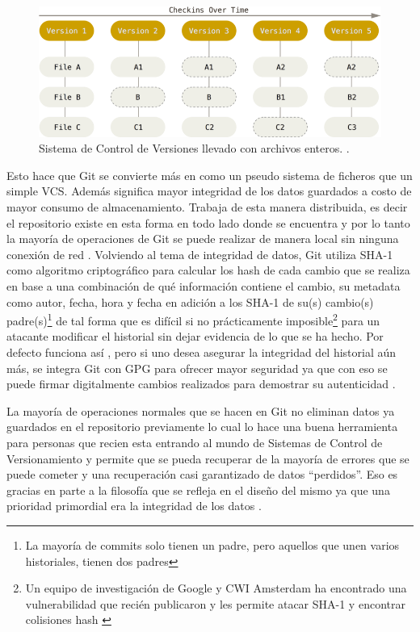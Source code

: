 \begin{figure}
  \begin{center}
      \includegraphics[width=\textwidth]{Figures/vcs-backup.png}
  \end{center}
  \caption{Sistema de Control de Versiones llevado con archivos enteros. \citep{PROGIT-Git-Intro}.}
  \label{VCS-Backup}
\end{figure}

Esto hace que Git se convierte más en como un pseudo sistema de ficheros que un simple VCS. Además significa mayor integridad de los datos guardados a costo de mayor consumo de almacenamiento. Trabaja de esta manera distribuida, es decir el repositorio existe en esta forma en todo lado donde se encuentra y por lo tanto la mayoría de operaciones de Git se puede realizar de manera local sin ninguna conexión de red \citep{PROGIT-Git-Intro}.
Volviendo al tema de integridad de datos, Git utiliza SHA-1 como algoritmo criptográfico para calcular los hash de cada cambio que se realiza en base a una combinación de qué información contiene el cambio, su metadata como autor, fecha, hora y fecha en adición a los SHA-1 de su(s) cambio(s) padre(s)\footnote{La mayoría de commits solo tienen un padre, pero aquellos que unen varios historiales, tienen dos padres} de tal forma que es difícil si no prácticamente imposible\footnote{Un equipo de investigación de Google y CWI Amsterdam ha encontrado una vulnerabilidad que recién publicaron y les permite atacar SHA-1 y encontrar colisiones hash \citep{Shattered-Paper}} para un atacante modificar el historial sin dejar evidencia de lo que se ha hecho. Por defecto funciona así \citep{PROGIT-Git-Intro}, pero si uno desea asegurar la integridad del historial aún más, se integra Git con GPG para ofrecer mayor seguridad ya que con eso se puede firmar digitalmente cambios realizados para demostrar su autenticidad \citep{PROGIT-Git-GPG}.

La mayoría de operaciones normales  que se hacen en Git no eliminan datos ya guardados en el repositorio previamente lo cual lo hace una buena herramienta para personas que recien esta entrando al mundo de Sistemas de Control de Versionamiento y permite que se pueda recuperar de la mayoría de errores que se puede cometer y una recuperación casi garantizado de datos “perdidos”. Eso es gracias en parte a la filosofía que se refleja en el diseño del mismo ya que una prioridad primordial era la integridad de los datos \citep{PROGIT-Git-Intro}.

